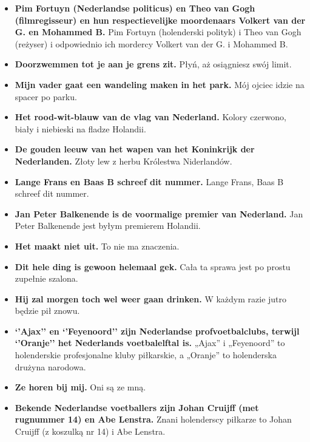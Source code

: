 \documentclass[
]{book}
\providecommand{\tightlist}{%
  \setlength{\itemsep}{0pt}\setlength{\parskip}{0pt}}
\begin{document}
\begin{itemize}
\tightlist
\item
  \textbf{Pim Fortuyn (Nederlandse politicus) en Theo van Gogh (filmregisseur) en hun respectievelijke moordenaars Volkert van der G. en Mohammed B.} Pim Fortuyn (holenderski polityk) i Theo van Gogh (reżyser) i odpowiednio ich mordercy Volkert van der G. i Mohammed B.\\
\item
  \textbf{Doorzwemmen tot je aan je grens zit.} Płyń, aż osiągniesz swój limit.\\
\item
  \textbf{Mijn vader gaat een wandeling maken in het park.} Mój ojciec idzie na spacer po parku.\\
\item
  \textbf{Het rood-wit-blauw van de vlag van Nederland.} Kolory czerwono, biały i niebieski na fladze Holandii.\\
\item
  \textbf{De gouden leeuw van het wapen van het Koninkrijk der Nederlanden.} Złoty lew z herbu Królestwa Niderlandów.\\
\item
  \textbf{Lange Frans en Baas B schreef dit nummer.} Lange Frans, Baas B schreef dit nummer.\\
\item
  \textbf{Jan Peter Balkenende is de voormalige premier van Nederland.} Jan Peter Balkenende jest byłym premierem Holandii.\\
\item
  \textbf{Het maakt niet uit.} To nie ma znaczenia.\\
\item
  \textbf{Dit hele ding is gewoon helemaal gek.} Cała ta sprawa jest po prostu zupełnie szalona.\\
\item
  \textbf{Hij zal morgen toch wel weer gaan drinken.} W każdym razie jutro będzie pił znowu.\\
\item
  \textbf{`'Ajax'' en `'Feyenoord'' zijn Nederlandse profvoetbalclubs, terwijl `'Oranje'' het Nederlands voetbalelftal is.} „Ajax'' i „Feyenoord'' to holenderskie profesjonalne kluby piłkarskie, a „Oranje'' to holenderska drużyna narodowa.\\
\item
  \textbf{Ze horen bij mij.} Oni są ze mną.\\
\item
  \textbf{Bekende Nederlandse voetballers zijn Johan Cruijff (met rugnummer 14) en Abe Lenstra.} Znani holenderscy piłkarze to Johan Cruijff (z koszulką nr 14) i Abe Lenstra.\\

\end{itemize}
\end{document}

